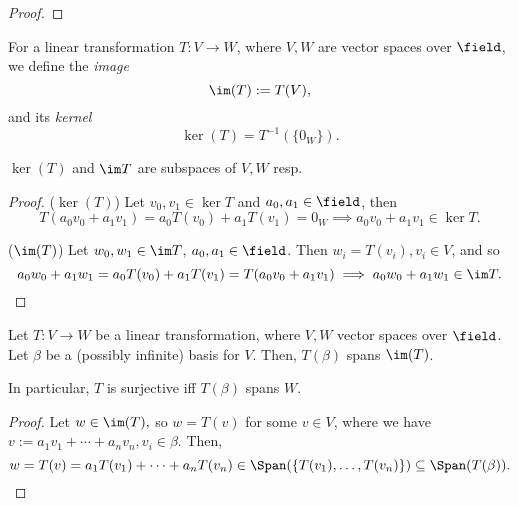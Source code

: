 \begin{proof}
\end{proof}

\begin{definition}
    For a linear transformation $T: V \to W$, where $V, W$ are vector spaces over $\field$, we define the \emph{image} \[
        \im (T)  := T(V),
    \]
    and its \emph{kernel} \[
    \ker (T) = T^{-1}(\{0_W\}).
    \]
\end{definition}

\begin{proposition}
    $\ker (T)$ and $\im T$ are subspaces of $V, W$ resp.
\end{proposition}

\begin{proof}
 \noindent($\ker (T)$) Let $v_0, v_1 \in \ker T$ and $a_0, a_1 \in \field$, then \[
 T(a_0 v_0  + a_1 v_1) = a_0T(v_0) + a_1T(v_1) = 0_W \implies a_0v_0 + a_1v_1 \in \ker T.   
 \]

\noindent ($\im (T)$) Let $w_0, w_1 \in \im T$, $a_0, a_1 \in \field$. Then $w_i = T(v_i), v_i \in V$, and so \[
a_0 w_0 + a_1 w_1 = a_0 T(v_0) + a_1T(v_1) = T(a_0 v_0 + a_1 v_1) \implies a_0 w_0 + a_1 w_1 \in \im T.    
\]
\end{proof}

\begin{proposition}
    Let $T: V \to W$ be a linear transformation, where $V, W$ vector spaces over $\field$. Let $\beta$ be a (possibly infinite) basis for $V$. Then, $T (\beta)$ spans $\im (T)$. 
    
    In particular, $T$ is surjective iff $T(\beta)$ spans $W$.
\end{proposition}

\begin{proof}
    Let $w \in \im(T),$ so $w = T(v)$ for some $v \in V$, where we have $v:= a_1 v_1 + \cdots + a_n v_n, v_i \in \beta$. Then, \[
    w = T(v) = a_1 T(v_1) + \cdots + a_n T(v_n) \in \Span(\{T(v_1), \dots, T(v_n)\}) \subseteq \Span(T(\beta)).
    \]

\end{proof}
